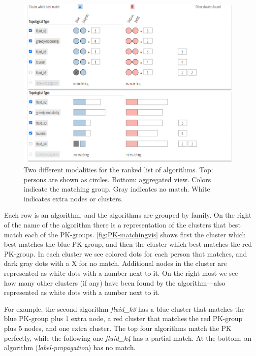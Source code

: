 \begin{figure}[!ht]
\centering
\includegraphics[width=\linewidth]{static/figures/PK-Clustering/VISPaperFigures/matchingExampleFinal.png}
\caption{Two different modalities for the ranked list of algorithms. Top: persons are shown as circles. Bottom: aggregated view. Colors indicate the matching group. Gray indicates no match. White indicates extra nodes or clusters.}
\label{fig:PK-matchingvis}
\end{figure}

Each row is an algorithm, and the algorithms are grouped by family. On the right of the name of the algorithm there is a representation of the clusters that best match each of the PK-groups. \autoref{fig:PK-matchingvis} shows first the cluster which best matches the blue PK-group, and then the cluster which best matches the red PK-group. In each cluster we see colored dots for each person that matches, and dark gray dots with a X for no match. Additional nodes in the cluster are represented as white dots with a number next to it.  On the right most we see how many other clusters (if any) have been found by the algorithm---also represented as white dots with a number next to it.

For example, the second algorithm \emph{fluid\_k3} has a blue cluster that matches the blue PK-group plus 1 extra node, a red cluster that matches the red PK-group plus 5 nodes, and one extra cluster.
The top four algorithms match the PK perfectly, while the following one \emph{fluid\_k4} has a partial match. At the bottom, an algorithm (\emph{label-propagation}) has no match.

